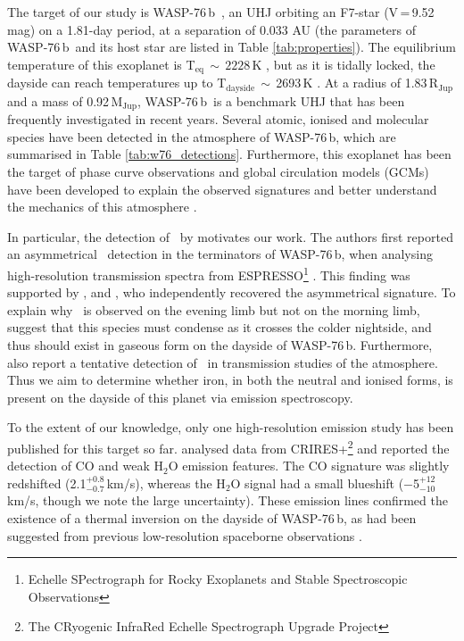 \documentclass{aa}
\newcommand{\feI}{\ion{Fe}{i}}
\newcommand{\feII}{\ion{Fe}{ii}}
\newcommand{\planet}{WASP-76\,b}
\begin{document}
The target of our study is \planet\ \citep{west2016}, an UHJ orbiting an F7-star (V\,=\,9.52\,mag) on a 1.81-day period, at a separation of 0.033 AU (the parameters of \planet\ and its host star are listed in Table \ref{tab:properties}). The equilibrium temperature of this exoplanet is T$_\mathrm{eq}\,\sim\,2228$\,K \citep{ehrenreich2020}, but as it is tidally locked, the dayside can reach temperatures up to T$_\mathrm{dayside}\,\sim\,$2693\,K \citep{garhart2020}. At a radius of 1.83\,R$_\mathrm{Jup}$ and a mass of 0.92\,M$_\mathrm{Jup}$, \planet\ is a benchmark UHJ that has been frequently investigated in recent years. Several atomic, ionised and molecular species have been detected in the atmosphere of \planet, which are summarised in Table \ref{tab:w76_detections}. Furthermore, this exoplanet has been the target of phase curve observations \citep{tsiaras2018, garhart2020, may2021, fu2021, demangeon2024} and global circulation models (GCMs) have been developed to explain the observed signatures and better understand the mechanics of this atmosphere \citep[e.g.][]{may2021, savel2022, wardenier2021, wardenier2023, schneider2022, beltz2022a, beltz2022b, beltz2023, sainsbury-martinez2023, demangeon2024}.

In particular, the detection of \feI\ by \citet{ehrenreich2020} motivates our work. The authors first reported an asymmetrical \feI\ detection in the terminators of \planet, when analysing high-resolution transmission spectra from ESPRESSO\footnote{Echelle SPectrograph for Rocky Exoplanets and Stable Spectroscopic Observations} \citep{pepe2021}. This finding was supported by \citet{kesseli2021, kesseli2022}, and \citet{pelletier2023}, who independently recovered the asymmetrical signature. To explain why \feI\ is observed on the evening limb but not on the morning limb, \citet{ehrenreich2020} suggest that this species must condense as it crosses the colder nightside, and thus should exist in gaseous form on the dayside of \planet. Furthermore, \citet{pelletier2023} also report a tentative detection of \feII\ in transmission studies of the atmosphere. Thus we aim to determine whether iron, in both the neutral and ionised forms, is present on the dayside of this planet via emission spectroscopy.

To the extent of our knowledge, only one high-resolution emission study has been published for this target so far. \citet{yan2023} analysed data from CRIRES+\footnote{The CRyogenic InfraRed Echelle Spectrograph Upgrade Project} \citep{dorn2023} and reported the detection of CO and weak H$_2$O emission features. The CO signature was slightly redshifted (2.1$^{+0.8}_{-0.7}$\,km/s), whereas the H$_2$O signal had a small blueshift ($-$5$^{+12}_{-10}$\,km/s, though we note the large uncertainty). These emission lines confirmed the existence of a thermal inversion on the dayside of \planet, as had been suggested from previous low-resolution spaceborne observations \citep{edwards2020, may2021}.
\end{document}
